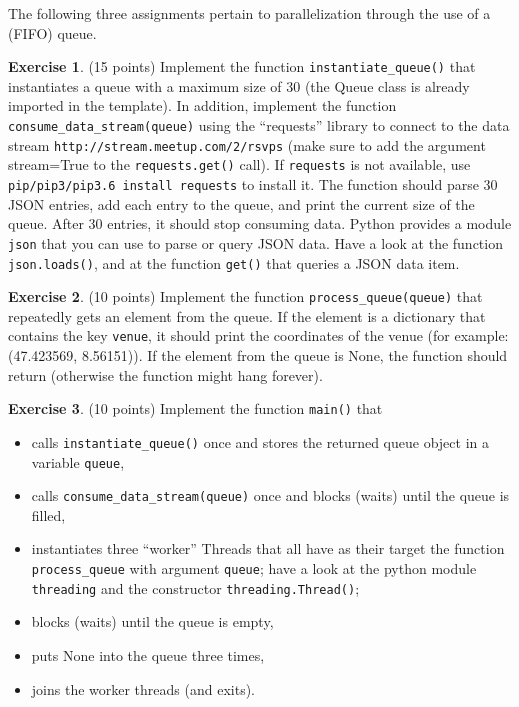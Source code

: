 \documentclass[a4paper]{report}
\theoremstyle{definition}
\newtheorem{exercise}{Exercise}
\begin{document}
The following three assignments pertain to parallelization through the
use of a (FIFO) queue.

\begin{exercise}
(15 points) Implement the function \texttt{\small instantiate\_queue()} that
instantiates a queue with a maximum size of 30 (the Queue class is
already imported in the template). In addition, implement the function
\texttt{\small consume\_data\_stream(queue)} using the “requests” library to connect to
the data stream \texttt{\small http://stream.meetup.com/2/rsvps} (make sure to add the
argument stream=True to the \texttt{\small requests.get()} call). If
\texttt{\small requests} is
not available, use \texttt{\small pip/pip3/pip3.6 install requests} to install it.
The function should parse 30 JSON entries, add each entry to the queue,
and print the current size of the queue. After 30 entries, it should
stop consuming data.
Python provides a module \texttt{\small json} that you can use to parse or
query JSON data. Have a look at the function \texttt{\small json.loads()}, and
at the function \texttt{\small get()} that queries a JSON data item.
\end{exercise}

\begin{exercise}
(10 points) Implement the function \texttt{\small process\_queue(queue)} that repeatedly
gets an element from the queue. If the element is a dictionary that
contains the key \texttt{\small venue}, it should print the coordinates of the
venue (for example: (47.423569, 8.56151)). If the element from the
queue is None, the function should return (otherwise the function might
hang forever).
\end{exercise}

\begin{exercise}
(10 points) Implement the function \texttt{\small main()} that

\begin{itemize}
\item calls \texttt{\small instantiate\_queue()} once and stores the returned queue object
in a variable \texttt{\small queue},
\item calls \texttt{\small consume\_data\_stream(queue)} once and blocks (waits) until the
queue is filled,
\item instantiates three “worker” Threads that all have as their target
the function \texttt{\small process\_queue} with argument \texttt{\small queue};
have a look at the python module \texttt{\small threading} and the
constructor \texttt{\small threading.Thread()};
\item blocks (waits) until the queue is empty,
\item puts None into the queue three times,
\item joins the worker threads (and exits).
\end{itemize}
\end{exercise}
\end{document}
